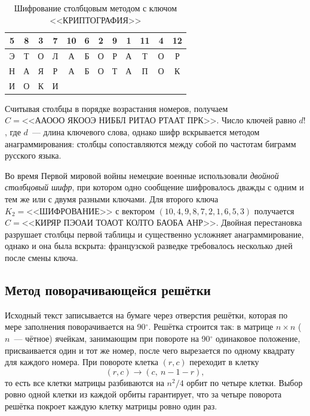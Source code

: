 \documentclass[14pt,a4paper]{extarticle}
\begin{document}
\begin{table}[H]
\caption{Шифрование столбцовым методом с ключом <<КРИПТОГРАФИЯ>>}
\label{tab:column}
\centering
\begin{tabular}{cccccccccccc}
\toprule
5 & 8 & 3 & 7 & 10 & 6 & 2 & 9 & 1 & 11 & 4 & 12 \\
\midrule
Э & Т & О & Л & А & Б & О & Р & А & Т & О & Р \\
Н & А & Я & Р & А & Б & О & Т & А & П & О & К \\
И & О & К & И &   &   &   &   &   &    &   &   \\
\bottomrule
\end{tabular}
\end{table}

Считывая столбцы в порядке возрастания номеров, получаем
$C = \text{<<ААООО ЯКООЭ НИББЛ РИТАО РТААТ ПРК>>}$. Число ключей равно $d!$, где
$d$~--- длина ключевого слова, однако шифр вскрывается методом анаграммирования:
столбцы сопоставляются между собой по частотам биграмм русского языка.

Во время Первой мировой войны немецкие военные использовали \emph{двойной столбцовый
шифр}, при котором одно сообщение шифровалось дважды с одним и тем же или с двумя
разными ключами. Для второго ключа $K_2 = \text{<<ШИФРОВАНИЕ>>}$ с вектором
$(10, 4, 9, 8, 7, 2, 1, 6, 5, 3)$ получается
$C = \text{<<КИРЯР ПЭОАИ ТОАОТ КОЛТО БАОБА АНР>>}$. Двойная перестановка разрушает
столбцы первой таблицы и существенно усложняет анаграммирование, однако и она была
вскрыта: французской разведке требовалось несколько дней после смены ключа.

\subsection{Метод поворачивающейся решётки}

Исходный текст записывается на бумаге через отверстия решётки, которая по мере
заполнения поворачивается на 90$^\circ$. Решётка строится так: в матрице $n \times n$
($n$~--- чётное) ячейкам, занимающим при повороте на 90$^\circ$ одинаковое положение,
присваивается один и тот же номер, после чего вырезается по одному квадрату для
каждого номера. При повороте клетка $(r, c)$ переходит в клетку
\begin{equation}
(r, c) \longrightarrow (c,\ n - 1 - r),
\end{equation}
то есть все клетки матрицы разбиваются на $n^2/4$ орбит по четыре клетки. Выбор
ровно одной клетки из каждой орбиты гарантирует, что за четыре поворота решётка
покроет каждую клетку матрицы ровно один раз.
\end{document}
